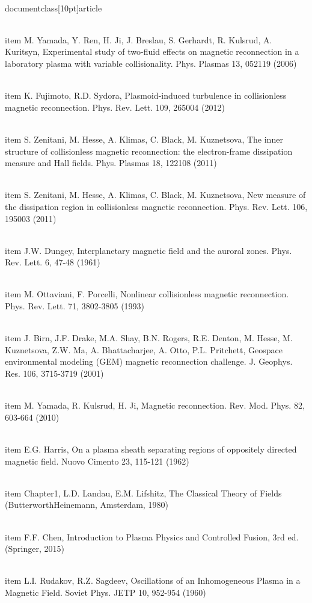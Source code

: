 \\documentclass[10pt]{article}
\begin{document}
{{{{  \\item M. Yamada, Y. Ren, H. Ji, J. Breslau, S. Gerhardt, R. Kulsrud, A. Kuritsyn, Experimental study of two-fluid effects on magnetic reconnection in a laboratory plasma with variable collisionality. Phys. Plasmas 13, 052119 (2006)

  \\item K. Fujimoto, R.D. Sydora, Plasmoid-induced turbulence in collisionless magnetic reconnection. Phys. Rev. Lett. 109, 265004 (2012)

  \\item S. Zenitani, M. Hesse, A. Klimas, C. Black, M. Kuznetsova, The inner structure of collisionless magnetic reconnection: the electron-frame dissipation measure and Hall fields. Phys. Plasmas 18, 122108 (2011)

  \\item S. Zenitani, M. Hesse, A. Klimas, C. Black, M. Kuznetsova, New measure of the dissipation region in collisionless magnetic reconnection. Phys. Rev. Lett. 106, 195003 (2011)

  \\item J.W. Dungey, Interplanetary magnetic field and the auroral zones. Phys. Rev. Lett. 6, 47-48 (1961)

  \\item M. Ottaviani, F. Porcelli, Nonlinear collisionless magnetic reconnection. Phys. Rev. Lett. 71, 3802-3805 (1993)

  \\item J. Birn, J.F. Drake, M.A. Shay, B.N. Rogers, R.E. Denton, M. Hesse, M. Kuznetsova, Z.W. Ma, A. Bhattacharjee, A. Otto, P.L. Pritchett, Geospace environmental modeling (GEM) magnetic reconnection challenge. J. Geophys. Res. 106, 3715-3719 (2001)

  \\item M. Yamada, R. Kulsrud, H. Ji, Magnetic reconnection. Rev. Mod. Phys. 82, 603-664 (2010)

  \\item E.G. Harris, On a plasma sheath separating regions of oppositely directed magnetic field. Nuovo Cimento 23, 115-121 (1962)

  \\item Chapter1, L.D. Landau, E.M. Lifshitz, The Classical Theory of Fields (ButterworthHeinemann, Amsterdam, 1980)

  \\item F.F. Chen, Introduction to Plasma Physics and Controlled Fusion, 3rd ed. (Springer, 2015)

  \\item L.I. Rudakov, R.Z. Sagdeev, Oscillations of an Inhomogeneous Plasma in a Magnetic Field. Soviet Phys. JETP 10, 952-954 (1960)

}}}}
\end{document}
